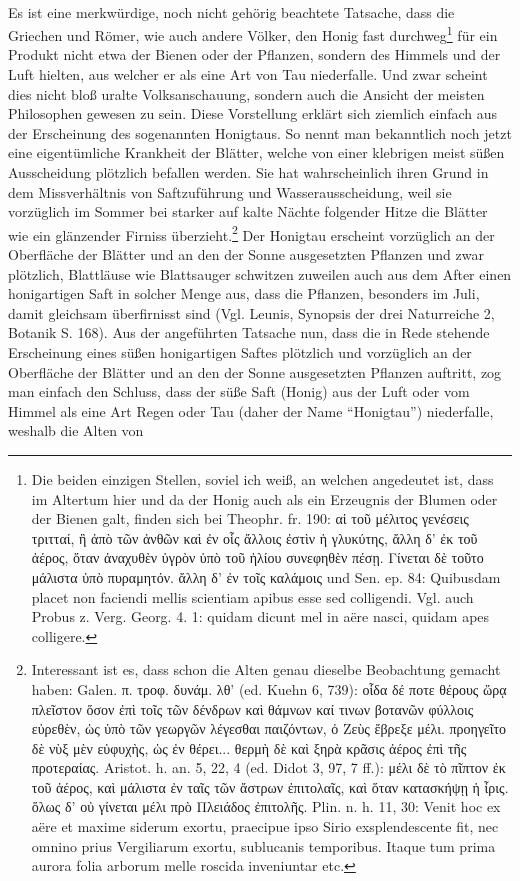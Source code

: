 \documentclass[a4paper, 11pt, oneside]{article}
\begin{document}
\paragraph{}
Es ist eine merkwürdige, noch nicht gehörig beachtete Tatsache, dass die Griechen und Römer, wie auch andere Völker, den Honig fast durchweg\footnote{Die beiden einzigen Stellen, soviel ich weiß, an welchen angedeutet ist, dass im Altertum hier und da der Honig auch als ein Erzeugnis der Blumen oder der Bienen galt, finden sich bei Theophr. fr. 190: αἱ τοῦ μέλιτος γενέσεις τριτταί, ἢ ἀπὸ τῶν ἀνθῶν καὶ ἐν οἷς ἄλλοις ἐστὶν ἡ γλυκύτης, ἄλλη δ' ἐκ τοῦ ἀέρος, ὅταν ἀναχυθὲν ὑγρὸν ὑπὸ τοῦ ἡλίου συνεφηθὲν πέσῃ. Γίνεται δὲ τοῦτο μάλιστα ὑπὸ πυραμητόν. ἄλλη δ' ἐν τοῖς καλάμοις und Sen. ep. 84: Quibusdam placet non faciendi mellis scientiam apibus esse sed colligendi. Vgl. auch Probus z. Verg. Georg. 4. 1: quidam dicunt mel in aëre nasci, quidam apes colligere.} für ein Produkt nicht etwa der Bienen oder der Pflanzen, sondern des Himmels und der Luft hielten, aus welcher er als eine Art von Tau niederfalle. Und zwar scheint dies nicht bloß uralte Volksanschauung, sondern auch die Ansicht der meisten Philosophen gewesen zu sein. Diese Vorstellung erklärt sich ziemlich einfach aus der Erscheinung des sogenannten Honigtaus. So nennt man bekanntlich noch jetzt eine eigentümliche Krankheit der Blätter, welche von einer klebrigen meist süßen Ausscheidung plötzlich befallen werden. Sie hat wahrscheinlich ihren Grund in dem Missverhältnis von Saftzuführung und Wasserausscheidung, weil sie vorzüglich im Sommer bei starker auf kalte Nächte folgender Hitze die Blätter wie ein glänzender Firniss überzieht.\footnote{Interessant ist es, dass schon die Alten genau dieselbe Beobachtung gemacht haben: Galen. π. τροφ. δυνάμ. λθ' (ed. Kuehn 6, 739): οἷδα δέ ποτε θέρους ὥρᾳ πλεῖστον ὅσον ἐπὶ τοῖς τῶν δένδρων καὶ θάμνων καί τινων βοτανῶν φύλλοις εὐρεθὲν, ὡς ὑπὸ τῶν γεωργῶν λέγεσθαι παιζόντων, ὀ Ζεὺς ἔβρεξε μέλι. προηγεῖτο δὲ νὺξ μὲν εὐφυχὴς, ὡς ἐν θέρει... θερμὴ δὲ καὶ ξηρὰ κρᾶσις ἀέρος ἐπὶ τῆς προτεραίας. Aristot. h. an. 5, 22, 4 (ed. Didot 3, 97, 7 ff.): μέλι δὲ τὸ πῖπτον ἐκ τοῦ ἀέρος, καὶ μάλιστα ἐν ταῖς τῶν ἄστρων ἐπιτολαῖς, καὶ ὅταν κατασκήψῃ ἡ ἶρις. ὅλως δ' οὐ γίνεται μέλι πρὸ Πλειάδος ἐπιτολῆς. Plin. n. h. 11, 30: Venit hoc ex aëre et maxime siderum exortu, praecipue ipso Sirio exsplendescente fit, nec omnino prius Vergiliarum exortu, sublucanis temporibus. Itaque tum prima aurora folia arborum melle roscida inveniuntar etc.} Der Honigtau erscheint vorzüglich an der Oberfläche der Blätter und an den der Sonne ausgesetzten Pflanzen und zwar plötzlich, Blattläuse wie Blattsauger schwitzen zuweilen auch aus dem After einen honigartigen Saft in solcher Menge aus, dass die Pflanzen, besonders im Juli, damit gleichsam überfirnisst sind (Vgl. Leunis, Synopsis der drei Naturreiche 2, Botanik S. 168). Aus der angeführten Tatsache nun, dass die in Rede stehende Erscheinung eines süßen honigartigen Saftes plötzlich und vorzüglich an der Oberfläche der Blätter und an den der Sonne ausgesetzten Pflanzen auftritt, zog man einfach den Schluss, dass der süße Saft (Honig) aus der Luft oder vom Himmel als eine Art Regen oder Tau (daher der Name "`Honigtau"') niederfalle, weshalb die Alten von 
\end{document}

